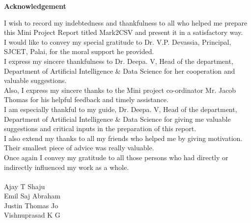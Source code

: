 \newpage
\thispagestyle{empty}
\begin{center}
  \vspace*{1cm}
  \textbf{\large Acknowledgement}
\end{center}
I wish to record my indebtedness and thankfulness to all who helped me prepare this Mini Project Report titled Mark2CSV and present it in a satisfactory way. \\
I would like to convey my special gratitude to Dr. V.P. Devassia, Principal, SJCET, Palai, for the moral support he provided. \\
I express my sincere thankfulness to Dr. Deepa. V, Head of the department, Department of Artificial Intelligence \& Data Science for her cooperation and valuable suggestions. \\ 
Also, I express my sincere thanks to the Mini project co-ordinator Mr. Jacob Thomas for his helpful feedback and timely assistance. \\
I am especially thankful to my guide, Dr. Deepa. V, Head of the department, Department of Artificial Intelligence \& Data Science for giving me valuable suggestions and critical inputs in the preparation of this report. \\
I also extend my thanks to all my friends who helped me by giving motivation. Their smallest piece of advice was really valuable. \\
Once again I convey my gratitude to all those persons who had directly or indirectly influenced my work as a whole.\\
\\
Ajay T Shaju\\
Emil Saj Abraham\\
Justin Thomas Jo\\
Vishnuprasad K G

